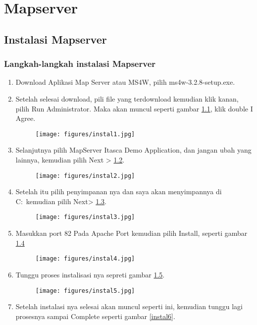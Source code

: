 \chapter{Mapserver}
\section{Instalasi Mapserver}
\subsection{Langkah-langkah instalasi Mapserver}
\begin{enumerate}
    \item Download Aplikasi Map Server atau MS4W, pilih ms4w-3.2.8-setup.exe.
    \item Setelah selesai download, pili file yang terdownload kemudian klik kanan, pilih Run Administrator. Maka akan muncul seperti gambar \ref{instal1}, klik double I Agree.
    \begin{figure}[!htbp]
    \centering
    \texttt{[image: figures/instal1.jpg]}
    \label{instal1}
\end{figure}
    \item Selanjutnya pilih MapServer Itasca Demo Application, dan jangan ubah yang lainnya, kemudian pilih Next > \ref{instal2}.
    \begin{figure}[!htbp]
    \centering
    \texttt{[image: figures/instal2.jpg]}
    \label{instal2}
\end{figure}
    \item Setelah itu pilih penyimpanan nya dan saya akan menyimpannya di C:\ kemudian pilih Next> \ref{instal3}. 
    \begin{figure}[!htbp]
    \centering
    \texttt{[image: figures/instal3.jpg]}
    \label{instal3}
\end{figure}
    \item Masukkan port 82 Pada Apache Port kemudian pilih Install, seperti gambar \ref{instal4}
     \begin{figure}[!htbp]
    \centering
    \texttt{[image: figures/instal4.jpg]}
    \label{instal4}
\end{figure}
    \item Tunggu proses instalisasi nya sepreti gambar \ref{instal5}. 
    \begin{figure}[!htbp]
    \centering
    \texttt{[image: figures/instal5.jpg]}
    \label{instal5}
\end{figure}
    \item Setelah instalasi nya selesai akan muncul seperti ini, kemudian tunggu lagi prosesnya sampai Complete seperti gambar \ref{instal6}.

\end{enumerate}

